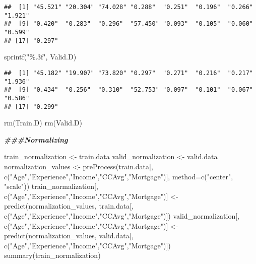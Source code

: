 \documentclass[
]{article}
\newenvironment{Shaded}{\begin{snugshade}}{\end{snugshade}}
\newcommand{\AttributeTok}[1]{\textcolor[rgb]{0.77,0.63,0.00}{#1}}
\newcommand{\DocumentationTok}[1]{\textcolor[rgb]{0.56,0.35,0.01}{\textbf{\textit{#1}}}}
\newcommand{\FunctionTok}[1]{\textcolor[rgb]{0.00,0.00,0.00}{#1}}
\newcommand{\NormalTok}[1]{#1}
\newcommand{\OtherTok}[1]{\textcolor[rgb]{0.56,0.35,0.01}{#1}}
\newcommand{\StringTok}[1]{\textcolor[rgb]{0.31,0.60,0.02}{#1}}
\begin{document}
\begin{verbatim}
##  [1] "45.521" "20.304" "74.028" "0.288"  "0.251"  "0.196"  "0.266"  "1.921" 
##  [9] "0.420"  "0.283"  "0.296"  "57.450" "0.093"  "0.105"  "0.060"  "0.599" 
## [17] "0.297"
\end{verbatim}

\begin{Shaded}
\begin{Highlighting}[]
\FunctionTok{sprintf}\NormalTok{(}\StringTok{"\%.3f"}\NormalTok{, Valid.D)}
\end{Highlighting}
\end{Shaded}

\begin{verbatim}
##  [1] "45.182" "19.907" "73.820" "0.297"  "0.271"  "0.216"  "0.217"  "1.936" 
##  [9] "0.434"  "0.256"  "0.310"  "52.753" "0.097"  "0.101"  "0.067"  "0.586" 
## [17] "0.299"
\end{verbatim}

\begin{Shaded}
\begin{Highlighting}[]
\FunctionTok{rm}\NormalTok{(Train.D)}
\FunctionTok{rm}\NormalTok{(Valid.D)}
\end{Highlighting}
\end{Shaded}

\begin{Shaded}
\begin{Highlighting}[]
\DocumentationTok{\#\#\#Normalizing}

\NormalTok{train\_normalization }\OtherTok{\textless{}{-}}\NormalTok{ train.data}
\NormalTok{valid\_normalization }\OtherTok{\textless{}{-}}\NormalTok{ valid.data}
\NormalTok{normalization\_values }\OtherTok{\textless{}{-}} \FunctionTok{preProcess}\NormalTok{(train.data[, }\FunctionTok{c}\NormalTok{(}\StringTok{"Age"}\NormalTok{,}\StringTok{"Experience"}\NormalTok{,}\StringTok{"Income"}\NormalTok{,}\StringTok{"CCAvg"}\NormalTok{,}\StringTok{"Mortgage"}\NormalTok{)], }\AttributeTok{method=}\FunctionTok{c}\NormalTok{(}\StringTok{"center"}\NormalTok{, }\StringTok{"scale"}\NormalTok{))}
\NormalTok{train\_normalization[, }\FunctionTok{c}\NormalTok{(}\StringTok{"Age"}\NormalTok{,}\StringTok{"Experience"}\NormalTok{,}\StringTok{"Income"}\NormalTok{,}\StringTok{"CCAvg"}\NormalTok{,}\StringTok{"Mortgage"}\NormalTok{)] }\OtherTok{\textless{}{-}} \FunctionTok{predict}\NormalTok{(normalization\_values, train.data[, }\FunctionTok{c}\NormalTok{(}\StringTok{"Age"}\NormalTok{,}\StringTok{"Experience"}\NormalTok{,}\StringTok{"Income"}\NormalTok{,}\StringTok{"CCAvg"}\NormalTok{,}\StringTok{"Mortgage"}\NormalTok{)])}
\NormalTok{valid\_normalization[, }\FunctionTok{c}\NormalTok{(}\StringTok{"Age"}\NormalTok{,}\StringTok{"Experience"}\NormalTok{,}\StringTok{"Income"}\NormalTok{,}\StringTok{"CCAvg"}\NormalTok{,}\StringTok{"Mortgage"}\NormalTok{)] }\OtherTok{\textless{}{-}} \FunctionTok{predict}\NormalTok{(normalization\_values, valid.data[, }\FunctionTok{c}\NormalTok{(}\StringTok{"Age"}\NormalTok{,}\StringTok{"Experience"}\NormalTok{,}\StringTok{"Income"}\NormalTok{,}\StringTok{"CCAvg"}\NormalTok{,}\StringTok{"Mortgage"}\NormalTok{)])}
\FunctionTok{summary}\NormalTok{(train\_normalization) }
\end{Highlighting}
\end{Shaded}
\end{document}
